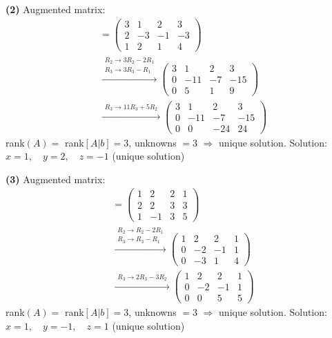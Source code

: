 \noindent\textbf{(2)} Augmented matrix:
\begin{align*}
[A|b] &= \left(\begin{array}{ccc|c}3 & 1 & 2 & 3 \\ 2 & -3 & -1 & -3 \\ 1 & 2 & 1 & 4\end{array}\right) \\
&\xrightarrow{\substack{R_2\to 3R_2-2R_1\\ R_3\to 3R_3-R_1}} \left(\begin{array}{ccc|c}3 & 1 & 2 & 3 \\ 0 & -11 & -7 & -15 \\ 0 & 5 & 1 & 9\end{array}\right) \\
&\xrightarrow{\substack{R_3\to 11R_3+5R_2}} \left(\begin{array}{ccc|c}3 & 1 & 2 & 3 \\ 0 & -11 & -7 & -15 \\ 0 & 0 & -24 & 24\end{array}\right)
\end{align*}
rank$(A)=$ rank$[A|b]=3$, unknowns $=3$ $\Rightarrow$ unique solution. Solution: $x=1, \quad y=2, \quad z=-1$ (unique solution)

\noindent\textbf{(3)} Augmented matrix:
\begin{align*}
[A|b] &= \left(\begin{array}{ccc|c}1 & 2 & 2 & 1 \\ 2 & 2 & 3 & 3 \\ 1 & -1 & 3 & 5\end{array}\right) \\
&\xrightarrow{\substack{R_2\to R_2-2R_1\\ R_3\to R_3-R_1}} \left(\begin{array}{ccc|c}1 & 2 & 2 & 1 \\ 0 & -2 & -1 & 1 \\ 0 & -3 & 1 & 4\end{array}\right) \\
&\xrightarrow{\substack{R_3\to 2R_3-3R_2}} \left(\begin{array}{ccc|c}1 & 2 & 2 & 1 \\ 0 & -2 & -1 & 1 \\ 0 & 0 & 5 & 5\end{array}\right)
\end{align*}
rank$(A)=$ rank$[A|b]=3$, unknowns $=3$ $\Rightarrow$ unique solution. Solution: $x=1, \quad y=-1, \quad z=1$ (unique solution)

